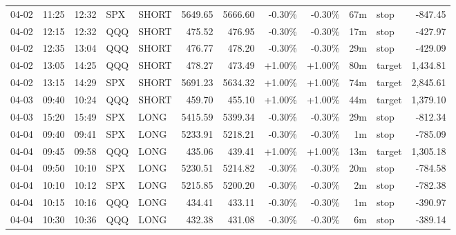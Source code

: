 \documentclass[11pt,a4paper,twoside]{article}
\begin{document}
\begin{center}
\begin{longtable}{>{\color{txtmain}}l l l l l r r r r r >{\color{txtmain}}l r}
04-02 & 11:25 & 12:32 & SPX & SHORT & 5649.65 & 5666.60 & \textcolor{lossred}{-0.30\%} & \textcolor{lossred}{-0.30\%} & 67m & stop & \textcolor{lossred}{-847.45} \\
04-02 & 12:15 & 12:32 & QQQ & SHORT & 475.52 & 476.95 & \textcolor{lossred}{-0.30\%} & \textcolor{lossred}{-0.30\%} & 17m & stop & \textcolor{lossred}{-427.97} \\
04-02 & 12:35 & 13:04 & QQQ & SHORT & 476.77 & 478.20 & \textcolor{lossred}{-0.30\%} & \textcolor{lossred}{-0.30\%} & 29m & stop & \textcolor{lossred}{-429.09} \\
04-02 & 13:05 & 14:25 & QQQ & SHORT & 478.27 & 473.49 & \textcolor{wingreen}{+1.00\%} & \textcolor{wingreen}{+1.00\%} & 80m & target & \textcolor{wingreen}{1,434.81} \\
04-02 & 13:15 & 14:29 & SPX & SHORT & 5691.23 & 5634.32 & \textcolor{wingreen}{+1.00\%} & \textcolor{wingreen}{+1.00\%} & 74m & target & \textcolor{wingreen}{2,845.61} \\
04-03 & 09:40 & 10:24 & QQQ & SHORT & 459.70 & 455.10 & \textcolor{wingreen}{+1.00\%} & \textcolor{wingreen}{+1.00\%} & 44m & target & \textcolor{wingreen}{1,379.10} \\
04-03 & 15:20 & 15:49 & SPX & LONG & 5415.59 & 5399.34 & \textcolor{lossred}{-0.30\%} & \textcolor{lossred}{-0.30\%} & 29m & stop & \textcolor{lossred}{-812.34} \\
04-04 & 09:40 & 09:41 & SPX & LONG & 5233.91 & 5218.21 & \textcolor{lossred}{-0.30\%} & \textcolor{lossred}{-0.30\%} & 1m & stop & \textcolor{lossred}{-785.09} \\
04-04 & 09:45 & 09:58 & QQQ & LONG & 435.06 & 439.41 & \textcolor{wingreen}{+1.00\%} & \textcolor{wingreen}{+1.00\%} & 13m & target & \textcolor{wingreen}{1,305.18} \\
04-04 & 09:50 & 10:10 & SPX & LONG & 5230.51 & 5214.82 & \textcolor{lossred}{-0.30\%} & \textcolor{lossred}{-0.30\%} & 20m & stop & \textcolor{lossred}{-784.58} \\
04-04 & 10:10 & 10:12 & SPX & LONG & 5215.85 & 5200.20 & \textcolor{lossred}{-0.30\%} & \textcolor{lossred}{-0.30\%} & 2m & stop & \textcolor{lossred}{-782.38} \\
04-04 & 10:15 & 10:16 & QQQ & LONG & 434.41 & 433.11 & \textcolor{lossred}{-0.30\%} & \textcolor{lossred}{-0.30\%} & 1m & stop & \textcolor{lossred}{-390.97} \\
04-04 & 10:30 & 10:36 & QQQ & LONG & 432.38 & 431.08 & \textcolor{lossred}{-0.30\%} & \textcolor{lossred}{-0.30\%} & 6m & stop & \textcolor{lossred}{-389.14} \\

\end{longtable}
\end{center}
\end{document}

